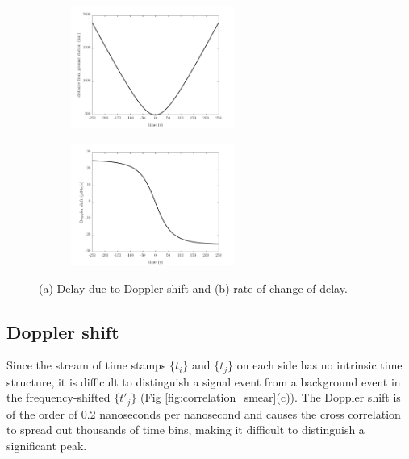 \begin{figure}[ht!]
	\centering
	\begin{subfigure}{0.49\linewidth}
		\centering
		\includegraphics[height=4cm]{assets/distance.png}
		\subcaption{}

	\end{subfigure}
	\begin{subfigure}{0.46\linewidth}
		\centering
		\includegraphics[height=4cm]{assets/doppler_shift.png}
		\subcaption{}
		
	\end{subfigure}

\caption{(a) Delay due to Doppler shift and (b) rate of change of delay.}
\label{fig:doppler_shift}
\end{figure}


\subsection{Doppler shift} 
Since the stream of time stamps $\{t_i\}$ and $\{t_j\}$ on each side has no intrinsic time structure, it is difficult to distinguish a signal event from a background event in the frequency-shifted $\{t'_j\}$ (Fig \ref{fig:correlation_smear}(c)). The Doppler shift is of the order of 0.2 nanoseconds per nanosecond and causes the cross correlation to spread out thousands of time bins, making it difficult to distinguish a significant peak.

